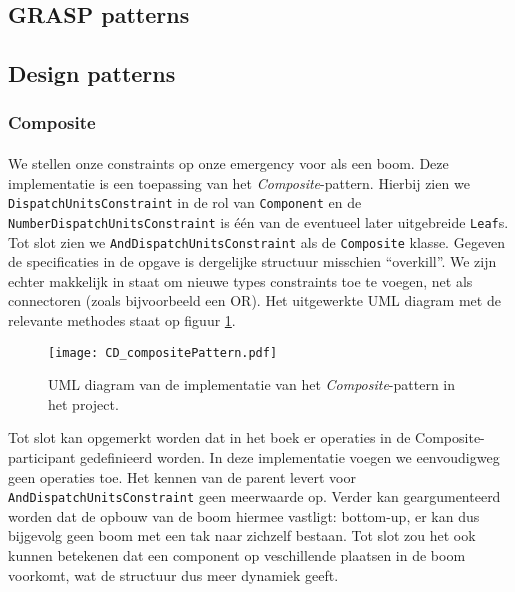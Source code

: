 \label{patterns}
\subsection{GRASP patterns}
\subsection{Design patterns}
\subsubsection{Composite}
\paragraph{}
We stellen onze constraints op onze emergency voor als een boom. Deze implementatie is een toepassing van het \textit{Composite}-pattern. Hierbij zien we \texttt{Dispatch\-Units\-Constraint} in de rol van \texttt{Component} en de \texttt{Number\-Dispatch\-Units\-Constraint} is \'e\'en van de eventueel later uitgebreide \texttt{Leaf}s. Tot slot zien we \texttt{And\-Dispatch\-Units\-Constraint} als de \texttt{Composite} klasse. Gegeven de specificaties in de opgave is dergelijke structuur misschien ``overkill''. We zijn echter makkelijk in staat om nieuwe types constraints toe te voegen, net als connectoren (zoals bijvoorbeeld een OR). Het uitgewerkte UML diagram met de relevante methodes staat op figuur \ref{fig:compositePattern}.
\begin{figure}[htb]
\texttt{[image: CD\_compositePattern.pdf]}
\caption{UML diagram van de implementatie van het \textit{Composite}-pattern in het project.}
\label{fig:compositePattern}
\end{figure}
Tot slot kan opgemerkt worden dat in het boek er operaties in de Composite-participant gedefinieerd worden. In deze implementatie voegen we eenvoudigweg geen operaties toe. Het kennen van de parent levert voor \verb+AndDispatchUnitsConstraint+ geen meerwaarde op. Verder kan geargumenteerd worden dat de opbouw van de boom hiermee vastligt: bottom-up, er kan dus bijgevolg geen boom met een tak naar zichzelf bestaan. Tot slot zou het ook kunnen betekenen dat een component op veschillende plaatsen in de boom voorkomt, wat de structuur dus meer dynamiek geeft.

